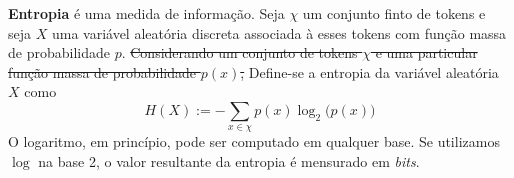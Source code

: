 \documentclass{automatextcc}
\begin{document}



\textbf{Entropia} é uma medida de informação. Seja $\chi$ um conjunto finto de tokens e seja $X$ uma variável aleatória discreta associada à esses tokens com função massa de probabilidade $p$.
\sout{Considerando um conjunto de tokens $\chi$ e uma particular função massa de probabilidade $p(x)$,} Define-se a entropia da variável aleatória $X$ como
\begin{equation}
    \label{entropia}
    H(X) := - \sum_{x \in \chi} p(x) \log_2 \big(p(x)\big) 
\end{equation}
O logaritmo, em princípio, pode ser computado em qualquer base. Se utilizamos $\log$ na base 2, o valor resultante da entropia é mensurado em \textit{bits}. 
\end{document}
